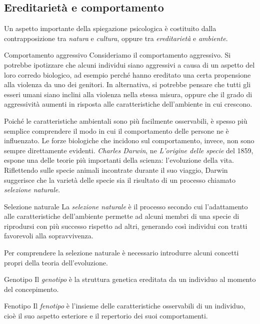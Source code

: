 \documentclass[a4paper]{article}
\begin{document}
\subsection{Ereditarietà e comportamento}
Un aspetto importante della spiegazione psicologica è costituito dalla contrapposizione tra \emph{natura} e \emph{cultura}, oppure tra \emph{ereditarietà} e \emph{ambiente}.
\begin{snippetexample}{Comportamento aggressivo}
    Consideriamo il comportamento aggressivo. Si potrebbe ipotizzare che alcuni individui siano aggressivi a causa di un aspetto del loro corredo biologico, ad esempio perché hanno ereditato una certa propensione alla violenza da uno dei genitori. In alternativa, si potrebbe pensare che tutti gli esseri umani siano inclini alla violenza nella stessa misura, oppure che il grado di aggressività aumenti in risposta alle caratteristiche dell'ambiente in cui crescono.
\end{snippetexample}
Poiché le caratteristiche ambientali sono più facilmente osservabili, è spesso più semplice comprendere il modo in cui il comportamento delle persone ne è influenzato. Le forze biologiche che incidono sul comportamento, invece, non sono sempre direttamente evidenti.
\emph{Charles Darwin}, ne \emph{L'origine delle specie} del 1859, espone una delle teorie più importanti della scienza: l'evoluzione della vita. Riflettendo sulle specie animali incontrate durante il suo viaggio, Darwin suggerisce che la varietà delle specie sia il risultato di un processo chiamato \emph{selezione naturale}.
\begin{snippetdefinition}{Selezione naturale}
    La \emph{selezione naturale} è il processo secondo cui l'adattamento alle caratteristiche dell'ambiente permette ad alcuni membri di una specie di riprodursi con più successo rispetto ad altri, generando così individui con tratti favorevoli alla sopravvivenza.
\end{snippetdefinition}
Per comprendere la selezione naturale è necessario introdurre alcuni concetti propri della teoria dell'evoluzione.
\begin{snippetdefinition}{Genotipo}
    Il \emph{genotipo} è la struttura genetica ereditata da un individuo al momento del concepimento.
\end{snippetdefinition}
\begin{snippetdefinition}{Fenotipo}
    Il \emph{fenotipo} è l'insieme delle caratteristiche osservabili di un individuo, cioè il suo aspetto esteriore e il repertorio dei suoi comportamenti.
\end{snippetdefinition}
\end{document}
